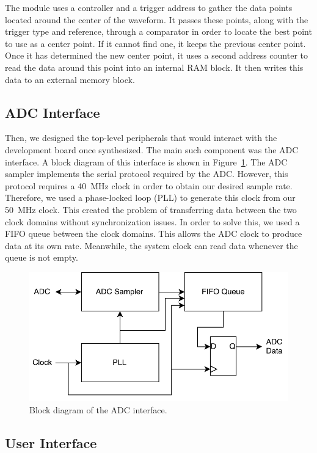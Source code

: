 \documentclass[journal,hidelinks]{IEEEtran}
\begin{document}
The module uses a controller and a trigger address to gather the data points located around the center of the waveform. It passes these points, along with the trigger type and reference, through a comparator in order to locate the best point to use as a center point. If it cannot find one, it keeps the previous center point. Once it has determined the new center point, it uses a second address counter to read the data around this point into an internal RAM block. It then writes this data to an external memory block.

\subsection{ADC Interface}

Then, we designed the top-level peripherals that would interact with the development board once synthesized. The main such component was the ADC interface. A block diagram of this interface is shown in Figure~\ref{fig:adc_interface}. The ADC sampler implements the serial protocol required by the ADC. However, this protocol requires a 40~MHz clock in order to obtain our desired sample rate. Therefore, we used a phase-locked loop (PLL) to generate this clock from our 50~MHz clock. This created the problem of transferring data between the two clock domains without synchronization issues. In order to solve this, we used a FIFO queue between the clock domains. This allows the ADC clock to produce data at its own rate. Meanwhile, the system clock can read data whenever the queue is not empty.

\begin{figure}[!htb]
  \centering
  \includegraphics[width=\columnwidth]{diagrams/adc_interface.pdf}
  \caption{Block diagram of the ADC interface.}
  \label{fig:adc_interface}
\end{figure}

\subsection{User Interface}
\end{document}
